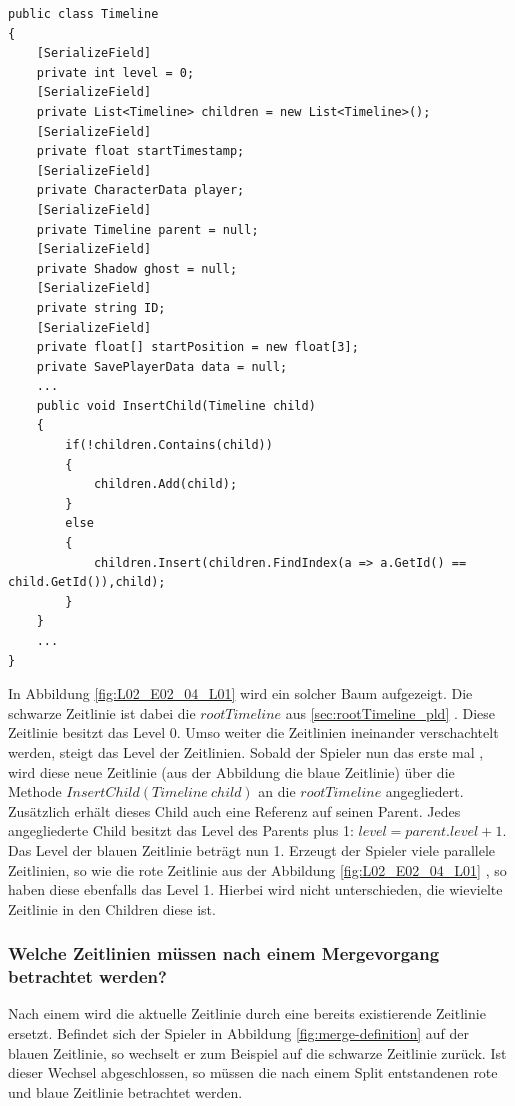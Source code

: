 \begin{lstlisting}[caption={Ausschnitt aus Timeline aus dem alten Prototyp}, label={sec:old_timeline}]
public class Timeline
{
    [SerializeField]
    private int level = 0;
    [SerializeField]
    private List<Timeline> children = new List<Timeline>();
    [SerializeField]
    private float startTimestamp;
    [SerializeField]
    private CharacterData player;
    [SerializeField]
    private Timeline parent = null;
    [SerializeField]
    private Shadow ghost = null;
    [SerializeField]
    private string ID;
    [SerializeField]
    private float[] startPosition = new float[3];
    private SavePlayerData data = null;
    ...
    public void InsertChild(Timeline child)
    {
        if(!children.Contains(child))
        {
            children.Add(child);
        }
        else
        {
            children.Insert(children.FindIndex(a => a.GetId() == child.GetId()),child);
        }
    }
    ...
}
\end{lstlisting}

In Abbildung \ref{fig:L02_E02_04_L01}  wird ein solcher Baum aufgezeigt. Die schwarze Zeitlinie ist dabei die $rootTimeline$ aus \ref{sec:rootTimeline_pld} . Diese Zeitlinie besitzt das Level 0. Umso weiter die Zeitlinien ineinander verschachtelt werden, steigt das Level der Zeitlinien. Sobald der Spieler nun das erste mal , wird diese neue Zeitlinie (aus der Abbildung die blaue Zeitlinie) über die Methode $InsertChild(Timeline ~child)$ an die $rootTimeline$ angegliedert. Zusätzlich erhält dieses Child auch eine Referenz auf seinen Parent. Jedes angegliederte Child besitzt das Level des Parents plus 1: $level = parent.level +1$. Das Level der blauen Zeitlinie beträgt nun 1. Erzeugt der Spieler viele parallele  Zeitlinien, so wie die rote Zeitlinie aus der Abbildung \ref{fig:L02_E02_04_L01} , so haben diese ebenfalls das Level 1. Hierbei wird nicht unterschieden, die wievielte Zeitlinie in den Children diese ist. 

\subsubsection{Welche Zeitlinien müssen nach einem Mergevorgang betrachtet werden?}\label{sec:good_02}
Nach einem  wird die aktuelle Zeitlinie durch eine bereits existierende Zeitlinie ersetzt. Befindet sich der Spieler in Abbildung \ref{fig:merge-definition} auf der blauen Zeitlinie, so wechselt er zum Beispiel auf die schwarze Zeitlinie zurück. Ist dieser Wechsel abgeschlossen, so müssen die nach einem Split entstandenen rote und blaue Zeitlinie betrachtet werden.

